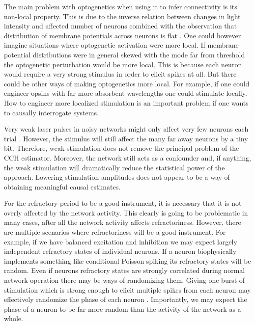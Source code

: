 \documentclass[11pt]{article}
\begin{document}
The main problem with optogenetics when using it to infer connectivity is its non-local property. This is due to the inverse relation between changes in light intensity and affected number of neurons combined with the observation that distribution of membrane potentials across neurons is flat \citep{destexhe1999impact,rudolph2006use,pare1998impact}. One could however imagine situations where optogenetic activation were more local. If membrane potential distributions were in general skewed with the mode far from threshold the optogenetic perturbation would be more local. This is because each neuron would require a very strong stimulus in order to  elicit spikes at all. But there could be other ways of making optogenetics more local. For example, if one could engineer opsins with far more absorbent wavelengths one could stimulate locally. How to engineer more localized stimulation is an important problem if one wants to causally interrogate systems.

Very weak laser pulses in noisy networks might only affect very few neurons each trial \citep{English2017}. However, the stimulus will still affect the many far away neurons by a tiny bit. Therefore, weak stimulation does not remove the principal problem of the CCH estimator. Moreover, the network still acts as a confounder and, if anything, the weak stimulation will dramatically reduce the statistical power of the approach. Lowering stimulation amplitudes does not appear to be a way of obtaining meaningful causal estimates.

For the refractory period to be a good instrument, it is necessary that it is not overly affected by the network activity. This clearly is going to be problematic in many cases, after all the network activity affects refractoriness. However, there are multiple scenarios where refractoriness will be a good instrument. For example, if we have balanced excitation and inhibition we may expect largely independent refractory states of individual neurons. If a neuron biophysically implements something like conditional Poisson spiking its refractory states will be random. Even if neurons refractory states are strongly correlated during normal network operation there may be ways of randomizing them. Giving one burst of stimulation which is strong enough to elicit multiple spikes from each neuron may effectively randomize the phase of each neuron \citep{ermentrout2008reliability}. Importantly, we may expect the phase of a neuron to be far more random than the activity of the network as a whole.
\end{document}
